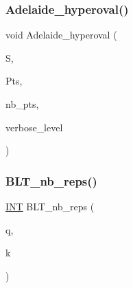 \mbox{\label{data_8_c_acca8a45187a8ab1f6adc350194f17b87}} 
\subsubsection{\texorpdfstring{Adelaide\+\_\+hyperoval()}{Adelaide\_hyperoval()}}
{\footnotesize\ttfamily void Adelaide\+\_\+hyperoval (\begin{DoxyParamCaption}\item[{\mbox{\hyperlink{classsubfield__structure}{subfield\+\_\+structure}} $\ast$}]{S,  }\item[{\mbox{\hyperlink{galois_8h_a09fddde158a3a20bd2dcadb609de11dc}{I\+NT}} $\ast$\&}]{Pts,  }\item[{\mbox{\hyperlink{galois_8h_a09fddde158a3a20bd2dcadb609de11dc}{I\+NT}} \&}]{nb\+\_\+pts,  }\item[{\mbox{\hyperlink{galois_8h_a09fddde158a3a20bd2dcadb609de11dc}{I\+NT}}}]{verbose\+\_\+level }\end{DoxyParamCaption})}

\mbox{\label{data_8_c_a7aaf7f3b281d06b0c293031b8f3533f7}} 
\subsubsection{\texorpdfstring{B\+L\+T\+\_\+nb\+\_\+reps()}{BLT\_nb\_reps()}}
{\footnotesize\ttfamily \mbox{\hyperlink{galois_8h_a09fddde158a3a20bd2dcadb609de11dc}{I\+NT}} B\+L\+T\+\_\+nb\+\_\+reps (\begin{DoxyParamCaption}\item[{\mbox{\hyperlink{galois_8h_a09fddde158a3a20bd2dcadb609de11dc}{I\+NT}}}]{q,  }\item[{\mbox{\hyperlink{galois_8h_a09fddde158a3a20bd2dcadb609de11dc}{I\+NT}}}]{k }\end{DoxyParamCaption})}

\mbox{\label{data_8_c_a2401ce989dcb0a552102a95f146fa716}} 
